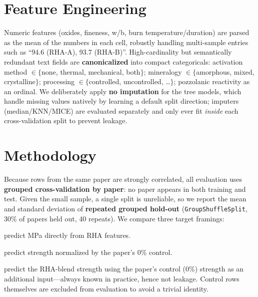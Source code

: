 \documentclass[11pt]{article}
\begin{document}

\section{Feature Engineering}
Numeric features (oxides, fineness, w/b, burn temperature/duration) are parsed as the
mean of the numbers in each cell, robustly handling multi-sample entries such as
``94.6 (RHA-A), 93.7 (RHA-B)''. High-cardinality but semantically redundant text
fields are \textbf{canonicalized} into compact categoricals: activation method
$\in\{$none, thermal, mechanical, both$\}$; mineralogy $\in\{$amorphous, mixed,
crystalline$\}$; processing $\in\{$controlled, uncontrolled, \dots$\}$; pozzolanic
reactivity as an ordinal. We deliberately apply \textbf{no imputation} for the
tree models, which handle missing values natively by learning a default split
direction; imputers (median/KNN/MICE) are evaluated separately and only ever fit
\emph{inside} each cross-validation split to prevent leakage.

\section{Methodology}
Because rows from the same paper are strongly correlated, all evaluation uses
\textbf{grouped cross-validation by paper}: no paper appears in both training and test.
Given the small sample, a single split is unreliable, so we report the mean and
standard deviation of \textbf{repeated grouped hold-out} (\texttt{GroupShuffleSplit},
30\% of papers held out, 40 repeats). We compare three target framings:
\begin{description}\itemsep2pt
  \item[A. Absolute strength, all papers] predict MPa directly from RHA features.
  \item[B. Relative-to-control] predict strength normalized by the paper's 0\% control.
  \item[C. Absolute strength given control] predict the RHA-blend strength using the
        paper's control (0\%) strength as an additional input---always known in
        practice, hence not leakage. Control rows themselves are excluded from
        evaluation to avoid a trivial identity.
\end{description}

\end{document}

